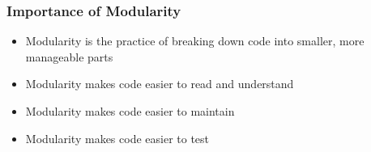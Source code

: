 \documentclass[serif, 9pt, aspectratio=32]{beamer}
\begin{document}
\begin{frame}
    \centering
    \frametitle{Importance of Modularity}
    \begin{itemize}
        \setlength{\itemsep}{3em}
        \item Modularity is the practice of breaking down code into smaller, more manageable parts
        \item Modularity makes code easier to read and understand
        \item Modularity makes code easier to maintain
        \item Modularity makes code easier to test
    \end{itemize}
\end{frame}
\end{document}

